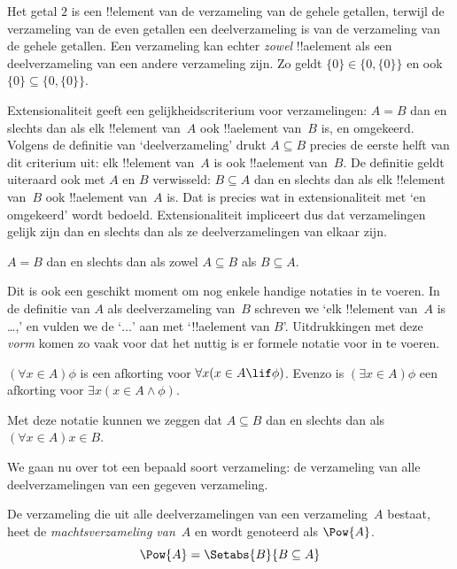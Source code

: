 \documentclass[openany]{memoir}
\begin{document}
\begin{ex}
Het getal $2$ is een !!{element} van de verzameling van de gehele
getallen, terwijl de verzameling van de even getallen een
deelverzameling is van de verzameling van de gehele getallen. Een
verzameling kan echter \emph{zowel} !!a{element} als een deelverzameling van
een andere verzameling zijn. Zo geldt $\{0\} \in \{0, \{0\}\}$ en ook
$\{0\} \subseteq \{0, \{0\}\}$.
\end{ex}

Extensionaliteit geeft een gelijkheidscriterium voor verzamelingen:
$A = B$ dan en slechts dan als elk !!{element} van~$A$ ook
!!a{element} van~$B$ is, en omgekeerd. Volgens de definitie van
‘deelverzameling’ drukt $A \subseteq B$ precies de eerste helft van dit
criterium uit: elk !!{element} van~$A$ is ook !!a{element} van~$B$.
De definitie geldt uiteraard ook met $A$ en $B$ verwisseld: $B
\subseteq A$ dan en slechts dan als elk !!{element} van~$B$ ook
!!a{element} van~$A$ is. Dat is precies wat in extensionaliteit met ‘en
omgekeerd’ wordt bedoeld. Extensionaliteit impliceert dus dat
verzamelingen gelijk zijn dan en slechts dan als ze deelverzamelingen
van elkaar zijn.

\begin{prop}
$A = B$ dan en slechts dan als zowel $A \subseteq B$ als
$B \subseteq A$.
\end{prop}

Dit is ook een geschikt moment om nog enkele handige notaties in te
voeren. In de definitie van $A$ als deelverzameling van~$B$ schreven
we ‘elk !!{element} van~$A$ is \dots,’ en vulden we de ‘$\dots$’ aan
met ‘!!a{element} van $B$’. Uitdrukkingen met deze \emph{vorm} komen
zo vaak voor dat het nuttig is er formele notatie voor in te voeren.

\begin{defn}
$(\forall x \in A)\phi$ is een afkorting voor $\forall x(x \in A \lif
\phi)$. Evenzo is $(\exists x \in A)\phi$ een afkorting voor $\exists
x(x \in A \land \phi)$.
\end{defn}

Met deze notatie kunnen we zeggen dat $A \subseteq B$ dan en slechts
dan als $(\forall x \in A)x \in B$.

We gaan nu over tot een bepaald soort verzameling: de verzameling van
alle deelverzamelingen van een gegeven verzameling.

\begin{defn}[Machtsverzameling]
De verzameling die uit alle deelverzamelingen van een verzameling~$A$
bestaat, heet de \emph{machtsverzameling van}~$A$ en wordt genoteerd
als $\Pow{A}$.
  \[
    \Pow{A} = \Setabs{B}{B \subseteq A} 
  \]
\end{defn}
\end{document}
